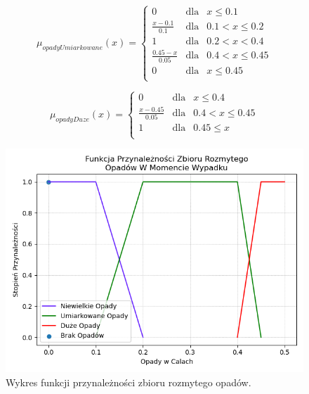 \documentclass{classrep}
\begin{document}
\begin{equation}
\mu _{opadyUmiarkowane}(x) =  \left\{ \begin{array}{rcl}
 0 & \mbox{dla} & x  \leq 0.1 \\
\frac{x - 0.1}{0.1} & \mbox{dla} & 0.1 < x \leq 0.2\\
1 & \mbox{dla} & 0.2 < x < 0.4\\
\frac{0.45 - x}{0.05} & \mbox{dla} & 0.4 < x \leq 0.45\\
 0 & \mbox{dla} & x  \leq 0.45 \\
\end{array}\right.
\end{equation}

\begin{equation}
\mu _{opadyDuze}(x) =  \left\{ \begin{array}{rcl}
 0 & \mbox{dla} & x \leq 0.4 \\
\frac{x - 0.45}{0.05} & \mbox{dla} & 0.4 < x \leq 0.45\\
1 & \mbox{dla} & 0.45 \leq x\\
\end{array}\right.
\end{equation}

\begin{figure}[h!]
 \centering
 \includegraphics[width=14cm]{FunkcjaPrzynaleznosciOpady.png}
 \vspace{-0.3cm}
 \caption{Wykres funkcji przynależności zbioru rozmytego opadów. }
 \label{rysunek do eksperymentu 1 wariantu 1}
\end{figure}
\newpage
\end{document}
